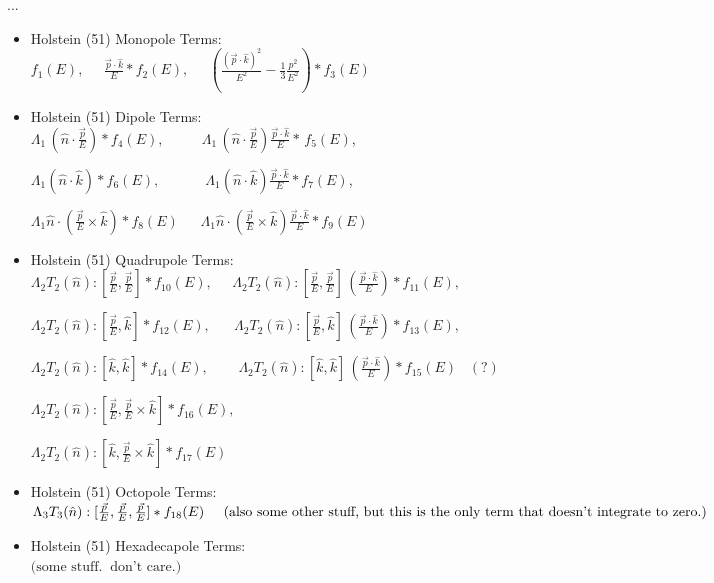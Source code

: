 ...

\begin{itemize}

	\item
Holstein (51) Monopole Terms: \\ 
$f_1(E),  \;\;\;\;\; 
\frac{\vec{p}\cdot \hat{k} }{E}* f_2(E), \;\;\;\;\; 
\left(\! \frac{ (\vec{p}\cdot\hat{k})^2 }{E^2}  - \frac{1}{3}\frac{p^2}{E^2} \!\right)\! * f_3(E)$

	\item
Holstein (51) Dipole Terms: \\
$\Lambda_1 \,( \hat{n} \cdot \frac{\vec{p}}{E} ) * f_4(E),  
\;\;\;\;\; \;\;\;\; \,
\Lambda_1 \, (\hat{n} \cdot \frac{\vec{p}}{E} ) \frac{\vec{p}\cdot \hat{k}}{E} *\, f_5(E)$, 

$\Lambda_1 ( \hat{n} \cdot \hat{k} ) * f_6(E), 
\;\;\;\;\; \;\;\;\;\; \;\,
\Lambda_1 ( \hat{n} \cdot \hat{k} ) \frac{\vec{p} \cdot \hat{k} }{E} * f_7(E)$, 

$\Lambda_1 \hat{n} \cdot \!\! \left( \frac{\vec{p}}{E} \times \hat{k} \right) * f_8(E)
\;\;\;\;\; \,
\Lambda_1 \hat{n} \cdot \!\! \left( \frac{\vec{p}}{E} \times \hat{k} \right) \frac{\vec{p}\cdot\hat{k}}{E} * f_9(E)
$

	\item
Holstein (51) Quadrupole Terms: \\
$\Lambda_2 T_2(\hat{n}):[\frac{\vec{p}}{E}, \frac{\vec{p}}{E}] * f_{10}(E), 
\;\;\;\;\; 
\Lambda_2 T_2(\hat{n}):[\frac{\vec{p}}{E}, \frac{\vec{p}}{E}] \, (\frac{\vec{p}\cdot \hat{k}}{E} ) * f_{11}(E),
$

$\Lambda_2 T_2(\hat{n}):[\frac{\vec{p}}{E}, \hat{k}] * f_{12}(E),  
\;\;\;\;\; \; 
\Lambda_2 T_2(\hat{n}):[\frac{\vec{p}}{E}, \hat{k}] \, (\frac{\vec{p}\cdot \hat{k}}{E} ) * f_{13}(E),
$

$\Lambda_2 T_2(\hat{n}):[\hat{k}, \hat{k}] * f_{14}(E), 
\;\;\;\;\; \; \;\,
\Lambda_2 T_2(\hat{n}):[\hat{k}, \hat{k}] \, (\frac{\vec{p}\cdot \hat{k} }{E}) * f_{15}(E) \;\;\; (?)
$

$\Lambda_2 T_2(\hat{n}):[\frac{\vec{p}}{E}, \frac{\vec{p}}{E} \times \hat{k}] * f_{16}(E),
$

$\Lambda_2 T_2(\hat{n}):[\hat{k}, \frac{\vec{p}}{E} \times \hat{k}] * f_{17}(E)
$

	\item
Holstein (51) Octopole Terms:  \\ 
$ \Lambda_3 T_3(\hat{n}):[\frac{\vec{p}}{E}, \frac{\vec{p}}{E}, \frac{\vec{p}}{E}] * f_{18}(E) 
\;\;\;\;\;\; \\
\textrm{(also some other stuff, but this is the only term that doesn't integrate to zero.)}$

	\item
Holstein (51) Hexadecapole Terms:  \\ 
$\textrm{(some stuff.}  \;\; \textrm{don't care.)}$
\end{itemize}


